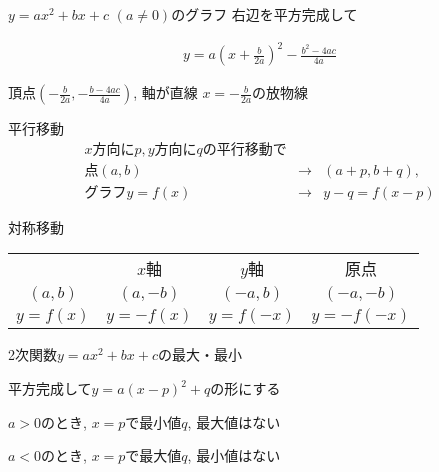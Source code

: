 \documentclass[aspectratio=169, 12pt]{beamer}
\begin{document}
\begin{frame}{$y=ax^2+bx+c$ $ (a\neq 0)$のグラフ}
    右辺を平方完成して \par
    \begin{eqnarray*}
        y=a\left( x+\frac{b}{2a} \right) ^2 -\frac{b^2-4ac}{4a}
    \end{eqnarray*}
    \begin{center}
        頂点$\left(-\frac{b}{2a}, -\frac{b-4ac}{4a}\right)$,
        軸が直線 $x=-\frac{b}{2a}$の放物線
    \end{center}
\end{frame}
\begin{frame}{平行移動}
    \begin{eqnarray*}
        x方向にp, y方向にqの平行移動で \\
        点(a,b)&\rightarrow& (a+p, b+q), \\
        グラフ y=f(x) &\rightarrow& y-q=f(x-p)
    \end{eqnarray*}
\end{frame}
\begin{frame}{対称移動}
    \begin{table}[h]
        \centering
        \begin{tabular}{cccc}
                     & $x$軸      & $y$軸      & 原点         \\
            $(a,b)$  & $(a, -b)$ & $(-a, b)$ & $(-a, -b)$ \\
            $y=f(x)$ & $y=-f(x)$ & $y=f(-x)$ & $y=-f(-x)$
        \end{tabular}
    \end{table}
\end{frame}
\begin{frame}{2次関数$y=ax^2+bx+c$の最大・最小}
    \begin{center}
        平方完成して$y=a(x-p)^2+q$の形にする \par
        $a>0$のとき, $x=p$で最小値$q$, 最大値はない\par
        $a<0$のとき,  $x=p$で最大値$q$, 最小値はない
    \end{center}
\end{frame}
\end{document}
